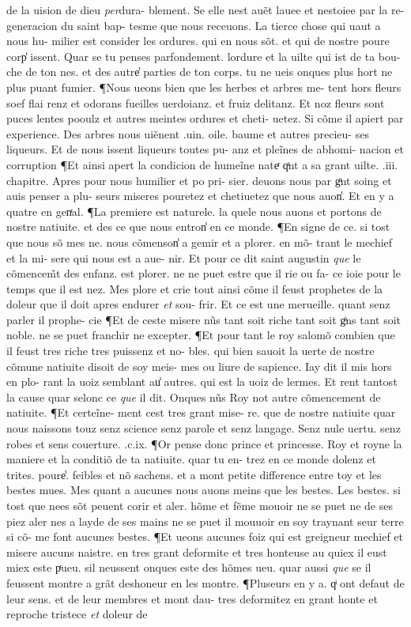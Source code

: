 \documentclass{article}
\begin{document}
\begin{pages}
de la uision de dieu \textit{per}dura- blement. Se elle nest auẽt lauee et nestoiee par la re- generacion du saint bap- tesme que nous receuons. La tierce chose qui uaut a nous hu- milier est consider les ordures. qui en nous sõt. et qui de nostre poure corp̾ issent. Quar se tu penses parfondement. lordure et la uilte qui ist de ta bou- che de ton nes. et des autre̾ parties de ton corps. tu ne ueis onques plus hort ne plus puant fumier. ¶Nous ueons bien que les herbes et arbres me- tent hors fleurs soef flai renz et odorans fueilles uerdoianz. et fruiz delitanz. Et noz fleurs sont puces lentes pooulz et autres meintes ordures et cheti- uetez. Si cõme il apiert par experience. Des arbres nous uiẽnent .uin. oile. baume et autres precieu- ses liqueurs. Et de nous issent liqueurs toutes pu- anz et pleĩnes de abhomi- nacion et corruption ¶Et ainsi apert la condicion de humeĩne nateͬ qͣnt a sa grant uilte. .iii. chapitre. Apres pour nous humilier et po pri- sier. deuons nous par gͣnt soing et auis penser a plu- seurs miseres pouretez et chetiuetez que nous auon̾. Et en y a quatre en genͬal. ¶La premiere est naturele. la quele nous auons et portons de nostre natiuite. et des ce que nous entron̾ en ce monde. ¶En signe de ce. si tost que nous sõ mes ne. nous cõmenson̾ a gemir et a plorer. en mõ- trant le mechief et la mi- sere qui nous est a aue- nir. Et pour ce dit saint augustin \textit{que} le cõmencem̃t des enfanz. est plorer. ne ne puet estre que il rie ou fa- ce ioie pour le temps que il est nez. Mes plore et crie tout ainsi cõme il feust prophetes de la doleur que il doit apres endurer \textit{et} sou- frir. Et ce est une merueille. quant senz parler il prophe- cie ¶Et de ceste misere nũs tant soit riche tant soit gͣns tant soit noble. ne se puet franchir ne excepter. ¶Et pour tant le roy salomõ combien que il feust tres riche tres puissenz et no- bles. qui bien sauoit la uerte de nostre cõmune natiuite disoit de soy meis- mes ou liure de sapience. Iay dit il mis hors en plo- rant la uoiz semblant au̾ autres. qui est la uoiz de lermes. Et rent tantost la cause quar selonc ce \textit{que} il dit. Onques nũs Roy not autre cõmencement de natiuite. ¶Et certeĩne- ment cest tres grant mise- re. que de nostre natiuite quar nous naissons touz senz science senz parole et senz langage. Senz nule uertu. senz robes et sens couerture. .c.ix. ¶Or pense donc prince et princesse. Roy et royne la maniere et la conditiõ de ta natiuite. quar tu en- trez en ce monde dolenz et trites. poure̾. feibles et nõ sachens. et a mont petite difference entre toy et les bestes mues. Mes quant a aucunes nous auons meins que les bestes. Les bestes. si tost que nees sõt peuent corir et aler. hõme et fẽme mouoir ne se puet ne de ses piez aler nes a layde de ses mains ne se puet il mouuoir en soy traynant seur terre si cõ- me font aucunes bestes. ¶Et ueons aucunes foiz qui est greigneur mechief et misere aucuns naistre. en tres grant deformite et tres honteuse au quiex il eust miex este pͬueu. sil neussent onques este des hõmes ueu. quar aussi \textit{que} se il feussent montre a grãt deshoneur en les montre. ¶Pluseurs en y a. qͥ ont defaut de leur sens. et de leur membres et mont dau- tres deformitez en grant honte et reproche tristece \textit{et} doleur de 
\end{pages}
\end{document}
